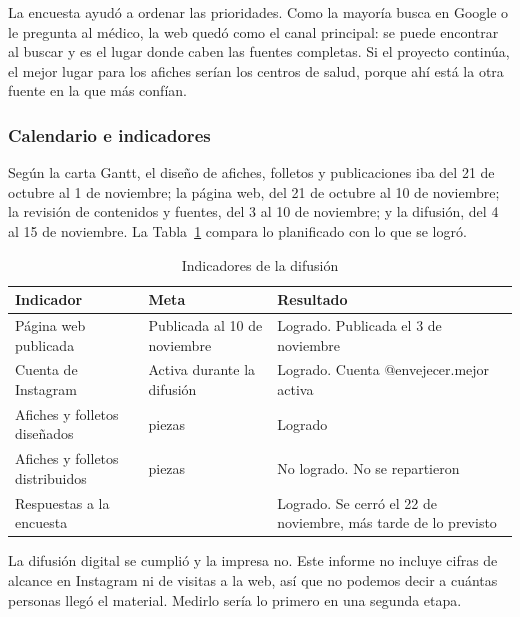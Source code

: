 \documentclass[12pt, letterpaper, table, xcdraw]{extarticle}
\renewcommand{\arraystretch}{2}
\newcommand{\leyendaFont}[1]{\fontsize{10}{12}\selectfont #1}
\begin{document}
La encuesta ayudó a ordenar las prioridades. Como la mayoría busca en Google o le pregunta al médico, la web quedó como el canal principal: se puede encontrar al buscar y es el lugar donde caben las fuentes completas. Si el proyecto continúa, el mejor lugar para los afiches serían los centros de salud, porque ahí está la otra fuente en la que más confían.

\subsubsection{Calendario e indicadores}

Según la carta Gantt, el diseño de afiches, folletos y publicaciones iba del 21 de octubre al 1 de noviembre; la página web, del 21 de octubre al 10 de noviembre; la revisión de contenidos y fuentes, del 3 al 10 de noviembre; y la difusión, del 4 al 15 de noviembre. La Tabla~\ref{tab:indicadores} compara lo planificado con lo que se logró.

\begin{table}[!htbp]
    \centering
    \caption{\leyendaFont{Indicadores de la difusión}}
    \label{tab:indicadores}
    {\small
    \renewcommand{\arraystretch}{1.4}
    \begin{tabularx}{\textwidth}{|>{\raggedright\arraybackslash}X|>{\raggedright\arraybackslash}p{3.6cm}|>{\raggedright\arraybackslash}p{5.2cm}|}
        \hline
        \textbf{Indicador} & \textbf{Meta} & \textbf{Resultado} \\ \hline
        Página web publicada & Publicada al 10 de noviembre & Logrado. Publicada el 3 de noviembre \\ \hline
        Cuenta de Instagram & Activa durante la difusión & Logrado. Cuenta @envejecer.mejor activa \\ \hline
        Afiches y folletos diseñados & 10 piezas & Logrado \\ \hline
        Afiches y folletos distribuidos & 10 piezas & No logrado. No se repartieron \\ \hline
        Respuestas a la encuesta & 20 & Logrado. Se cerró el 22 de noviembre, más tarde de lo previsto \\ \hline
    \end{tabularx}
    }
\end{table}

La difusión digital se cumplió y la impresa no. Este informe no incluye cifras de alcance en Instagram ni de visitas a la web, así que no podemos decir a cuántas personas llegó el material. Medirlo sería lo primero en una segunda etapa.
\end{document}
